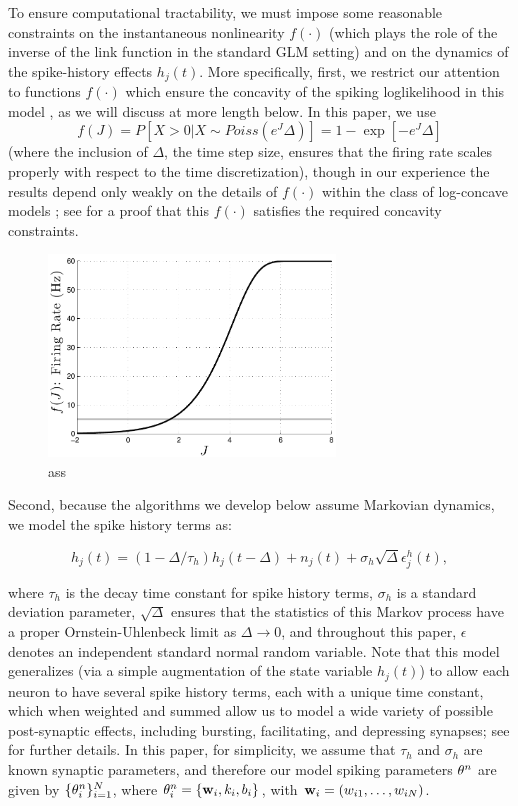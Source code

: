 To ensure computational tractability, we must impose some reasonable constraints on the instantaneous nonlinearity $f(\cdot)$ (which plays the role of the inverse of the link function in the standard GLM setting) and on the dynamics of the spike-history effects $h_j(t)$. More specifically, first, we restrict our attention to functions $f(\cdot)$ which ensure the concavity of the spiking loglikelihood in this model \cite{PAN04c}, as we will discuss at more length below. In this paper, we use \begin{equation} f(J) = P[X>0 | X \sim Poiss(e^J \Delta)] = 1 - \exp[-e^J \Delta] \end{equation} (where the inclusion of $\Delta$, the time step size, ensures that the firing rate scales properly with respect to the time discretization), though in our experience the results depend only weakly on the details of $f(\cdot)$ within the class of log-concave models \cite{LD89,PAN04c}; see \cite{Escola07} for a proof that this $f(\cdot)$ satisfies the required concavity constraints.

\begin{figure}[h]
\centering
\includegraphics[width=3in]{../figs/fr_vs_J}
\caption{ass}
\label{fig:egfluor}
\end{figure}

Second, because the algorithms we develop below assume Markovian dynamics, we model the spike history terms as: 

\begin{equation} \label{eqn:h:definition} h_j(t) = (1- \Delta/\tau_h) h_j(t- \Delta) +n_j(t) + \sigma_h \sqrt{\Delta} \epsilon^h_j(t), \end{equation} 
	
where $\tau_h$ is the decay time constant for spike history terms, $\sigma_h$ is a standard deviation parameter, $\sqrt{\Delta}$ ensures that the statistics of this Markov process have a proper Ornstein-Uhlenbeck limit as $\Delta \to 0$, and throughout this paper, $\epsilon$ denotes an independent standard normal random variable. Note that this model generalizes (via a simple augmentation of the state variable $h_j(t)$) to allow each neuron to have several spike history terms, each with a unique time constant, which when weighted and summed allow us to model a wide variety of possible post-synaptic effects, including bursting, facilitating, and depressing synapses; see \cite{Vogelstein2009} for further details. In this paper, for simplicity, we assume that $\tau_h$ and $\sigma_h$ are known synaptic parameters, and therefore our model spiking parameters $\mathbf{\theta}^n$ are given by $\{\mathbf{\theta}^n_i\}_{i=1}^N$, where $\mathbf{\theta}^n_i=\{\mathbf{w}_i,k_i,b_i\}$, with $\mathbf{w}_i=(w_{i1},\ldots, w_{iN})$.

